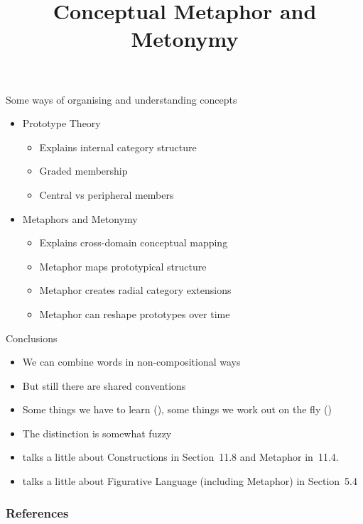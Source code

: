 \documentclass{beamer}
\title{Conceptual Metaphor and Metonymy}
\begin{document}

\maketitle

\begin{frame}{Some ways of organising and understanding concepts}

  \begin{itemize}
  \item Prototype Theory
    \begin{itemize}
    \item Explains internal category structure
    \item Graded membership
    \item Central vs peripheral members
    \end{itemize}
  \item Metaphors and Metonymy
    \begin{itemize}
    \item Explains cross-domain conceptual mapping
    \item Metaphor maps prototypical structure
    \item Metaphor creates radial category extensions
    \item Metaphor can reshape prototypes over time
    \end{itemize}
  \end{itemize}
  
\end{frame}



%


\begin{frame}{Conclusions}

\begin{itemize}
\item We can combine words in non-compositional ways
\item But still there are shared conventions
\item Some things we have to learn (), some things we work out
  on the fly ()
\item The distinction is somewhat fuzzy
\item \citet{Saeed:2015}  talks a little about Constructions in Section~11.8 and Metaphor in~11.4.
\item  \citet{Kroeger:2022} talks a little about Figurative Language (including Metaphor) in Section~5.4

\end{itemize}

\end{frame}




\begin{frame}[allowframebreaks]
  \frametitle{References}
  
  
\end{frame}
\end{document}
